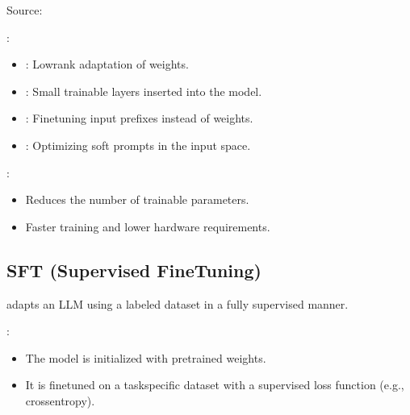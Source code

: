 \documentclass[letterpaper,11pt,english]{sphinxmanual}
\begin{document}
\sphinxAtStartPar
Source: 

\sphinxAtStartPar
{}:
\begin{itemize}
\item {} 
\sphinxAtStartPar
{}: Low\sphinxhyphen{}rank adaptation of weights.

\item {} 
\sphinxAtStartPar
{}: Small trainable layers inserted into the model.

\item {} 
\sphinxAtStartPar
{}: Fine\sphinxhyphen{}tuning input prefixes instead of weights.

\item {} 
\sphinxAtStartPar
{}: Optimizing soft prompts in the input space.

\end{itemize}

\sphinxAtStartPar
{}:
\begin{itemize}
\item {} 
\sphinxAtStartPar
Reduces the number of trainable parameters.

\item {} 
\sphinxAtStartPar
Faster training and lower hardware requirements.

\end{itemize}


\subsection{SFT (Supervised Fine\sphinxhyphen{}Tuning)}
\label{\detokenize{finetuning:sft-supervised-fine-tuning}}
\sphinxAtStartPar
{} adapts an LLM using a labeled dataset in a fully supervised manner.

\sphinxAtStartPar
{}:
\begin{itemize}
\item {} 
\sphinxAtStartPar
The model is initialized with pre\sphinxhyphen{}trained weights.

\item {} 
\sphinxAtStartPar
It is fine\sphinxhyphen{}tuned on a task\sphinxhyphen{}specific dataset with a supervised loss function (e.g., cross\sphinxhyphen{}entropy).

\end{itemize}
\end{document}
